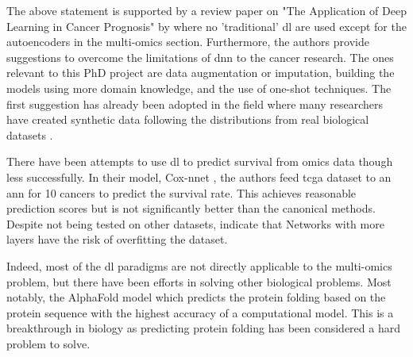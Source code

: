 The above statement is supported by a review paper on "The Application of Deep Learning in Cancer Prognosis" by \citet{Zhu2020-cv} where no 'traditional' \acrshort{dl} are used except for the autoencoders in the multi-omics section. Furthermore, the authors provide suggestions to overcome the limitations of \acrshort{dnn} to the cancer research. The ones relevant to this PhD project are data augmentation or imputation, building the models using more domain knowledge, and the use of one-shot techniques. The first suggestion has already been adopted in the field where many researchers have created synthetic data following the distributions from real biological datasets \citep{Zhao2012-wj,Leiserson2015-yk}.

There have been attempts to use \acrshort{dl} to predict survival from omics data though less successfully. In their model, Cox-nnet \citep{Ching2018-gq}, the authors feed \acrshort{tcga} dataset to an \acrshort{ann} for 10 cancers to predict the survival rate. This achieves reasonable prediction scores but is not significantly better than the canonical methods. Despite not being tested on other datasets, \citet{Ching2018-gq} indicate that Networks with more layers have the risk of overfitting the dataset.  

Indeed, most of the \acrshort{dl} paradigms are not directly applicable to the multi-omics problem, but there have been efforts in solving other biological problems. Most notably, the AlphaFold model \citep{Jumper2021-du} which predicts the protein folding based on the protein sequence with the highest accuracy of a computational model. This is a breakthrough in biology as predicting protein folding has been considered a hard problem to solve.



